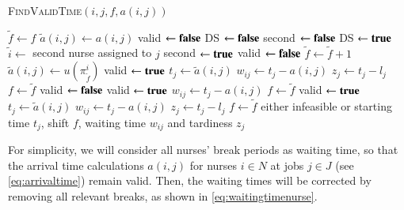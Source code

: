 \documentclass[a4paper,11pt,authoryear]{elsarticle}
\begin{document}
\begin{algorithm}[h]
\footnotesize
\caption{\textsc{FindValidTime}$(i, j, f, a(i,j))$}
\label{alg:findvalidtime}
\begin{algorithmic}[1]
	\State $\tilde{f} \gets f$
	\State $\tilde{a}(i,j) \gets a(i,j)$
	\State valid $\gets \textbf{false}$
	\State DS $\gets \textbf{false}$
	\State second $\gets \textbf{false}$
		\State DS $\gets \textbf{true}$
		\State $\tilde{i} \gets$ second nurse assigned to $j$
			\State second $\gets \textbf{true}$
				\State valid $\gets \textbf{false}$
				\Break
			\EndIf
		\EndIf
	\EndIf %
		\State $\tilde{f} \gets \tilde{f}+1$
		\State $\tilde{a}(i,j) \gets u(\pi_{\tilde{f}}^{i})$
					\Continue
				\Else
					\State valid $\gets \textbf{true}$
					\State $t_j \gets \tilde{a}(i,j)$
					\State $w_{ij} \gets t_j - a(i,j)$
					\State $z_j \gets t_j - l_j$
					\State $f \gets \tilde{f}$
				\EndIf
					\State valid $\gets \textbf{false}$
					\Break
					\Continue
				\Else
					\State valid $\gets \textbf{true}$
					\State $w_{ij} \gets t_j - a(i,j)$
					\State $f \gets \tilde{f}$
				\EndIf
			\EndIf %
				\Continue
			\Else
				\State valid $\gets \textbf{true}$
				\State $t_j \gets \tilde{a}(i,j)$
				\State $w_{ij} \gets t_j - a(i,j)$
				\State $z_j \gets t_j - l_j$
				\State $f \gets \tilde{f}$
			\EndIf
		\EndIf %
	\EndWhile
	\Return either infeasible or starting time $t_j$, shift $f$, waiting time $w_{ij}$ and tardiness $z_j$
\end{algorithmic}
\end{algorithm}

For simplicity, we will consider all nurses' break periods as waiting time, so that the arrival time calculations $a(i,j)$ for nurses $i \in N$ at jobs $j \in J$ (see \eqref{eq:arrivaltime}) remain valid. Then, the waiting times will be corrected by removing all relevant breaks, as shown in \eqref{eq:waitingtimenurse}.
\end{document}
